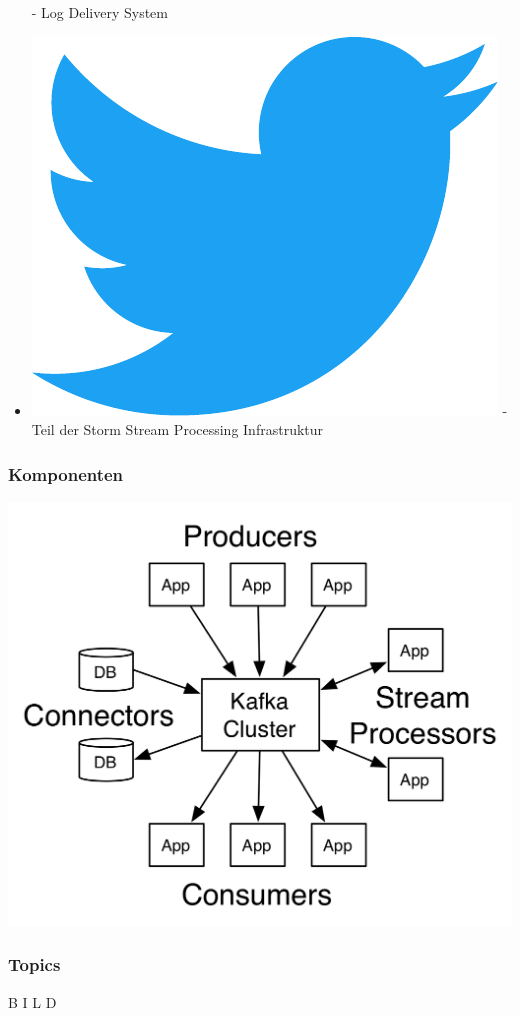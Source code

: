 \begin{frame}
\begin{itemize}
		- Log Delivery System
	\item \includegraphics[scale=0.1]{figure/twitter_logo.pdf} 
		- Teil der Storm Stream Processing Infrastruktur
\end{itemize}
\end{frame}

\begin{frame}
\frametitle{Komponenten}
	\centering
	\includegraphics[scale=1.4]{figure/kafka-apis.png}
\end{frame}

\begin{frame}
\frametitle{Topics}
	\begin{center}
		B I L D
	\end{center}
\end{frame}

